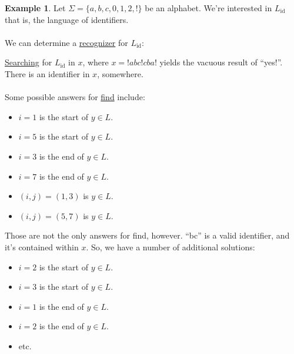 \documentclass[]{article}
\theoremstyle{definition}
\newtheorem{ex}{Example}[section]
\begin{document}
			\begin{ex}
				Let $\Sigma = \{a, b, c, 0, 1, 2, !\}$ be an alphabet. We're interested in $L_{\text{id}}$ \textendash{} that is, the language of identifiers.
				\\ \\
				We can determine a \underline{recognizer} for $L_{\text{id}}$:
				\begin{center}
				\end{center}

				\underline{Searching} for $L_{\text{id}}$ in $x$, where $x = !abc!cba!$ yields the vacuous result of ``yes!''. There is an identifier in $x$, somewhere.
				\\ \\
				Some possible answers for \underline{find} include:
				\begin{itemize}
					\item $i = 1$ is the start of $y \in L$.
					\item $i = 5$ is the start of $y \in L$.
					\item $i = 3$ is the end of $y \in L$.
					\item $i = 7$ is the end of $y \in L$.
					\item $(i, j) = (1, 3)$ is $y \in L$.
					\item $(i, j) = (5, 7)$ is $y \in L$.
				\end{itemize}

				Those are not the only answers for find, however. ``bc'' is a valid identifier, and it's contained within $x$. So, we have a number of additional solutions:
				\begin{itemize}
					\item $i = 2$ is the start of $y \in L$.
					\item $i = 3$ is the start of $y \in L$.
					\item $i = 1$ is the end of $y \in L$.
					\item $i = 2$ is the end of $y \in L$.
					\item etc.
				\end{itemize}


\end{ex}
\end{document}
